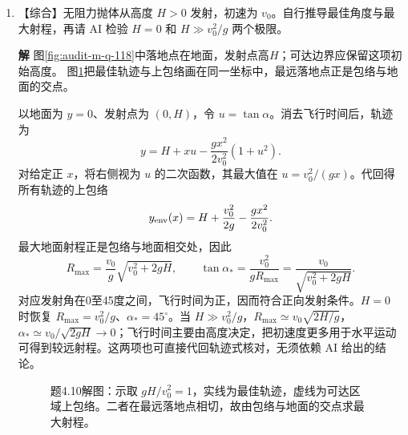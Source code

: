 \documentclass[11pt,openany,fontset=fandol]{ctexbook}
\theoremstyle{plain}\newtheorem{theorem}{定理}[chapter]\newtheorem{proposition}[theorem]{命题}
\theoremstyle{definition}\newtheorem{definition}{定义}[chapter]\newtheorem{example}{例}[chapter]
\theoremstyle{remark}\newtheorem*{remark}{说明}
\newcommand{\SolutionStart}{\par\nobreak\medskip\nobreak\noindent\textbf{解}\quad\ignorespaces}
\newenvironment{solution}{\SolutionStart}{\par\medskip}
\begin{document}
\begin{enumerate}[label=4.\arabic*,itemsep=3pt]
\begin{solution}
全部标准差加倍，$W$ 整体变为 $W/4$。目标函数整体乘 $1/4$，极小位置不变，故参数估计不变、$\chi^2$ 除以4。把给定测量误差视为已知时，参数协方差为 $(A^{\mathsf T}WA)^{-1}$，随之乘4，参数标准差乘2；不能同时改用残差估计未知方差的约定。

线性模型的系统偏差无法仅靠调整零点消除；加入三次项后，各残差均落在给定的单次测量误差尺度内。
\end{solution}

\item \begin{minipage}[t]{\linewidth}
【综合】无阻力抛体从高度 $H>0$ 发射，初速为 $v_0$。自行推导最佳角度与最大射程，再请 AI 检验 $H=0$ 和 $H\gg v_0^2/g$ 两个极限。

\end{minipage}

\begin{solution}
图\ref{fig:audit-m-q-118}中落地点在地面，发射点高$H$；可达边界应保留这项初始高度。
图\ref{fig:ex-4-10}把最佳轨迹与上包络画在同一坐标中，最远落地点正是包络与地面的交点。

以地面为 $y=0$、发射点为 $(0,H)$，令 $u=\tan\alpha$。消去飞行时间后，轨迹为
\[
y=H+xu-\frac{gx^2}{2v_0^2}(1+u^2).
\]
对给定正 $x$，将右侧视为 $u$ 的二次函数，其最大值在 $u=v_0^2/(gx)$。代回得所有轨迹的上包络
\[
y_{\rm env}(x)=H+\frac{v_0^2}{2g}-\frac{gx^2}{2v_0^2}.
\]
最大地面射程正是包络与地面相交处，因此
\[
R_{\max}=\frac{v_0}{g}\sqrt{v_0^2+2gH},\qquad
\tan\alpha_* =\frac{v_0^2}{gR_{\max}}
=\frac{v_0}{\sqrt{v_0^2+2gH}}.
\]
对应发射角在0至45度之间，飞行时间为正，因而符合正向发射条件。$H=0$ 时恢复 $R_{\max}=v_0^2/g$、$\alpha_*=45^\circ$。当 $H\gg v_0^2/g$，$R_{\max}\simeq v_0\sqrt{2H/g}$，$\alpha_*\simeq v_0/\sqrt{2gH}\to0$；飞行时间主要由高度决定，把初速度更多用于水平运动可得到较远射程。这两项也可直接代回轨迹式核对，无须依赖 AI 给出的结论。

\begin{figure}[H]\centering
{}
\caption{题4.10解图：示取 $gH/v_0^2=1$，实线为最佳轨迹，虚线为可达区域上包络。二者在最远落地点相切，故由包络与地面的交点求最大射程。}\label{fig:ex-4-10}
\end{figure}


\end{solution}
\end{enumerate}
\end{document}
